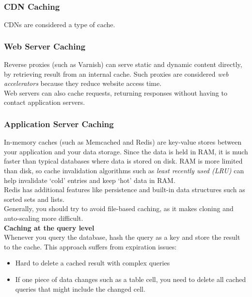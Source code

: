 \documentclass[12pt, titlepage]{article}
\begin{document}
\subsubsection{CDN Caching}

CDNs are considered a type of cache.

\subsubsection{Web Server Caching}

Reverse proxies (such as Varnish) can serve static and dynamic content directly, by retrieving result from an internal cache. Such proxies are considered \textit{web accelerators} because they reduce website access time. \\

Web servers can also cache requests, returning responses without having to contact application servers.

\subsubsection{Application Server Caching}

In-memory caches (such as Memcached and Redis) are key-value stores between your application and your data storage. Since the data is held in RAM, it is much faster than typical databases where data is stored on disk. RAM is more limited than disk, so cache invalidation algorithms such as \textit{least recently used (LRU)} can help invalidate `cold' entries and keep `hot' data in RAM. \\

Redis has additional features like persistence and built-in data structures such as sorted sets and lists. \\

Generally, you should try to avoid file-based caching, as it makes cloning and auto-scaling more difficult. \\

\textbf{Caching at the query level} \\
Whenever you query the database, hash the query as a key and store the result to the cache. This approach suffers from expiration issues:

\begin{itemize}
  \item Hard to delete a cached result with complex queries
  \item If one piece of data changes such as a table cell, you need to delete all cached queries that might include the changed cell.
\end{itemize}
\end{document}
